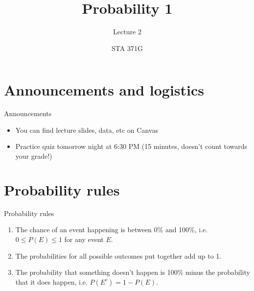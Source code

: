 \documentclass{beamer}\usepackage[]{graphicx}\usepackage[]{color}
\title{Probability 1}
\subtitle{Lecture 2}
\author{STA 371G}
\begin{document}
  \frame{\maketitle}



  \begin{darkframes}
    \section{Announcements and logistics}

    \begin{frame}{Announcements}
      \begin{itemize}
        \item You can find lecture slides, data, etc on Canvas
        \item Practice quiz tomorrow night at 6:30 PM (15 minutes, doesn't count towards your grade!)
      \end{itemize}
    \end{frame}

    \begin{frame}{}
    \end{frame}
    \begin{frame}{}
    \end{frame}
    \begin{frame}{}
    \end{frame}
   
    \section{Probability rules}

    \begin{frame}{Probability rules}
      \begin{enumerate}
        \item The chance of an event happening is between 0\% and 100\%, i.e. $0 \leq P(E) \leq 1$ for any event $E$.
        \item The probabilities for all possible outcomes put together add up to 1.
        \item The probability that something doesn’t happen is 100\% minus the probability that it does happen, i.e. $P(E^c) = 1-P(E)$.
      \end{enumerate}
    \end{frame}


\end{darkframes}
\end{document}
